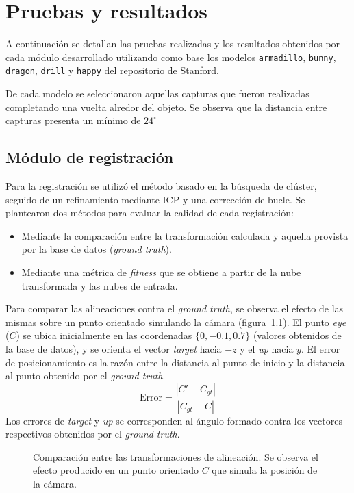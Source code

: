 \chapter{Pruebas y resultados}
	A continuación se detallan las pruebas realizadas y los resultados obtenidos
	por cada módulo desarrollado utilizando como base los modelos
	\texttt{armadillo}, \texttt{bunny}, \texttt{dragon}, \texttt{drill} y \texttt{happy}
	del repositorio de Stanford\cite{StanfordScanRep}.

	De cada modelo se seleccionaron aquellas capturas que fueron realizadas
	completando una vuelta alredor del objeto.
	Se observa que la distancia entre capturas presenta un mínimo de $24^{\circ}$

	\section{Módulo de registración}
	Para la registración se utilizó el método basado en la búsqueda de clúster,
	seguido de un refinamiento mediante ICP y una corrección de bucle.
	Se plantearon dos métodos para evaluar la calidad de cada registración:
	\begin{itemize}
		\item Mediante la comparación entre la transformación calculada y aquella provista por la base de datos (\emph{ground truth}).
		\item Mediante una métrica de \emph{fitness} que se obtiene a partir de la nube transformada y las nubes de entrada.
	\end{itemize}

	Para comparar las alineaciones contra el \emph{ground truth}, se
	observa el efecto de las mismas sobre un punto orientado simulando la
	cámara (figura~\ref{fig:err_reg}). El punto \emph{eye} ($C$) se ubica inicialmente en las coordenadas
	$\{0, -0.1, 0.7\}$ (valores obtenidos de la base de datos), y se
	orienta el vector \emph{target} hacia $-z$ y el \emph{up} hacia $y$.
	El error de posicionamiento es la razón entre la distancia al punto
	de inicio y la distancia al punto obtenido por el \emph{ground truth}.
	\[\text{Error} = \frac{|C'-C_{gt}|}{|C_{gt} - C|}\]
	Los errores de \emph{target} y \emph{up} se corresponden al ángulo formado contra los
	vectores respectivos obtenidos por el \emph{ground truth}.

	\begin{figure}
		\centering
		
		\caption{\label{fig:err_reg}Comparación entre las transformaciones de alineación.
		Se observa el efecto producido en un punto orientado $C$ que simula la posición de la cámara.}
	\end{figure}

